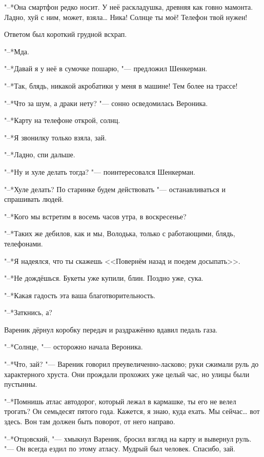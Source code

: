 "--*Она смартфон редко носит.
У неё раскладушка, древняя как говно мамонта.
Ладно, хуй с ним, может, взяла\ldots{}
Ника!
Солнце ты моё!
Телефон твой нужен!

Ответом был короткий грудной всхрап.

"--*Мда.

"--*Давай я у неё в сумочке пошарю, "--- предложил Шенкерман.

"--*Так, блядь, никакой акробатики у меня в машине!
Тем более на трассе!

"--*Что за шум, а драки нету? "--- сонно осведомилась Вероника.

"--*Карту на телефоне открой, солнц.

"--*Я звонилку только взяла, зай.

"--*Ладно, спи дальше.

"--*Ну и хуле делать тогда? "--- поинтересовался Шенкерман.

"--*Хуле делать?
По старинке будем действовать "--- останавливаться и спрашивать людей.

"--*Кого мы встретим в восемь часов утра, в воскресенье?

"--*Таких же дебилов, как и мы, Володька, только с работающими, блядь, телефонами.

"--*Я надеялся, что ты скажешь <<Повернём назад и поедем досыпать>>.

"--*Не дождёшься.
Букеты уже купили, блин.
Поздно уже, сука.

"--*Какая гадость эта ваша благотворительность.

"--*Заткнись, а?

Вареник дёрнул коробку передач и раздражённо вдавил педаль газа.

\asterism

\textspace

"--*Солнце, "--- осторожно начала Вероника.

"--*Что, зай? "--- Вареник говорил преувеличенно-ласково;
руки сжимали руль до характерного хруста.
Они прождали прохожих уже целый час, но улицы были пустынны.

"--*Помнишь атлас автодорог, который лежал в кармашке, ты его не велел трогать?
Он семьдесят пятого года.
Кажется, я знаю, куда ехать.
Мы сейчас\ldots{} вот здесь.
Вон там должен быть поворот, от него направо.

"--*Отцовский, "--- хмыкнул Вареник, бросил взгляд на карту и вывернул руль.
"--- Он всегда ездил по этому атласу.
Мудрый был человек.
Спасибо, зай.

